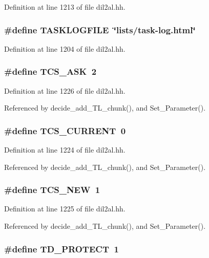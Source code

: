 Definition at line 1213 of file dil2al.hh.
\subsubsection{\setlength{\rightskip}{0pt plus 5cm}\#define TASKLOGFILE\ \char`\"{}lists/task-log.html\char`\"{}}\label{dil2al_8hh_a57}




Definition at line 1204 of file dil2al.hh.
\subsubsection{\setlength{\rightskip}{0pt plus 5cm}\#define TCS\_\-ASK\ 2}\label{dil2al_8hh_a78}




Definition at line 1226 of file dil2al.hh.

Referenced by decide\_\-add\_\-TL\_\-chunk(), and Set\_\-Parameter().
\subsubsection{\setlength{\rightskip}{0pt plus 5cm}\#define TCS\_\-CURRENT\ 0}\label{dil2al_8hh_a76}




Definition at line 1224 of file dil2al.hh.

Referenced by decide\_\-add\_\-TL\_\-chunk(), and Set\_\-Parameter().
\subsubsection{\setlength{\rightskip}{0pt plus 5cm}\#define TCS\_\-NEW\ 1}\label{dil2al_8hh_a77}




Definition at line 1225 of file dil2al.hh.

Referenced by decide\_\-add\_\-TL\_\-chunk(), and Set\_\-Parameter().
\subsubsection{\setlength{\rightskip}{0pt plus 5cm}\#define TD\_\-PROTECT\ 1}\label{dil2al_8hh_a31}




